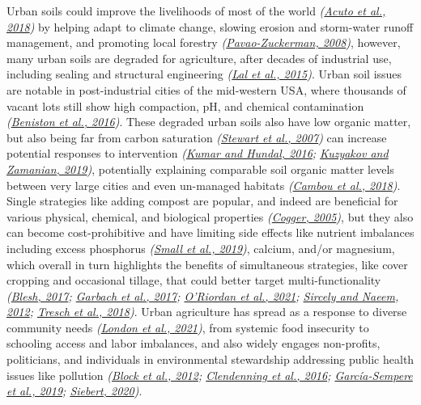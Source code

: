 \documentclass[
  12pt,
]{article}
\begin{document}
Urban soils could improve the livelihoods of most of the world \emph{(\protect\hyperlink{ref-acuto18}{Acuto et al., 2018})} by helping adapt to climate change, slowing erosion and storm-water runoff management, and promoting local forestry \emph{(\protect\hyperlink{ref-pavao-zuckerman08}{Pavao-Zuckerman, 2008})}, however, many urban soils are degraded for agriculture, after decades of industrial use, including sealing and structural engineering \emph{(\protect\hyperlink{ref-lal15}{Lal et al., 2015})}.
Urban soil issues are notable in post-industrial cities of the mid-western USA, where thousands of vacant lots still show high compaction, pH, and chemical contamination \emph{(\protect\hyperlink{ref-beniston16}{Beniston et al., 2016})}.
These degraded urban soils also have low organic matter, but also being far from carbon saturation \emph{(\protect\hyperlink{ref-stewart07}{Stewart et al., 2007})} can increase potential responses to intervention \emph{(\protect\hyperlink{ref-kumar16}{Kumar and Hundal, 2016}; \protect\hyperlink{ref-kuzyakov19}{Kuzyakov and Zamanian, 2019})}, potentially explaining comparable soil organic matter levels between very large cities and even un-managed habitats \emph{(\protect\hyperlink{ref-cambou18}{Cambou et al., 2018})}.
Single strategies like adding compost are popular, and indeed are beneficial for various physical, chemical, and biological properties \emph{(\protect\hyperlink{ref-cogger05}{Cogger, 2005})}, but they also can become cost-prohibitive and have limiting side effects like nutrient imbalances including excess phosphorus \emph{(\protect\hyperlink{ref-small19}{Small et al., 2019})}, calcium, and/or magnesium, which overall in turn highlights the benefits of simultaneous strategies, like cover cropping and occasional tillage, that could better target multi-functionality \emph{(\protect\hyperlink{ref-blesh17}{Blesh, 2017}; \protect\hyperlink{ref-garbach17}{Garbach et al., 2017}; \protect\hyperlink{ref-oriordan21}{O'Riordan et al., 2021}; \protect\hyperlink{ref-sircely12}{Sircely and Naeem, 2012}; \protect\hyperlink{ref-tresch18}{Tresch et al., 2018})}.
Urban agriculture has spread as a response to diverse community needs \emph{(\protect\hyperlink{ref-london21}{London et al., 2021})}, from systemic food insecurity to schooling access and labor imbalances, and also widely engages non-profits, politicians, and individuals in environmental stewardship addressing public health issues like pollution \emph{(\protect\hyperlink{ref-block12}{Block et al., 2012}; \protect\hyperlink{ref-clendenning16}{Clendenning et al., 2016}; \protect\hyperlink{ref-garcia-sempere19}{García-Sempere et al., 2019}; \protect\hyperlink{ref-siebert20}{Siebert, 2020})}.
\end{document}
